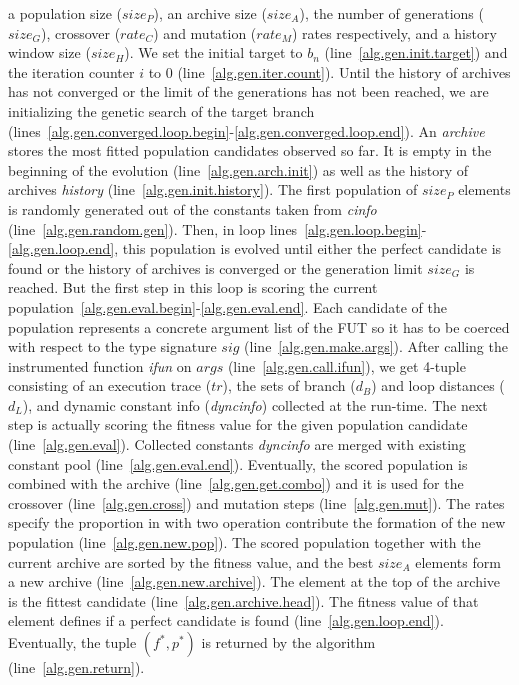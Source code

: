 \documentclass[sigconf]{acmart}
\begin{document}
a population size  ($size_P$), an archive size ($size_A$), the number of generations ($size_G$), crossover ($rate_C$) and mutation ($rate_M$) rates respectively, and a history window size ($size_H$). We set the initial target to $b_n$ (line~\ref{alg.gen.init.target}) and the iteration counter $i$ to 0 (line~\ref{alg.gen.iter.count}). Until the history of archives has not converged or the limit of the generations has not been reached, we are initializing the genetic search of the target branch (lines~\ref{alg.gen.converged.loop.begin}-\ref{alg.gen.converged.loop.end}). An \emph{archive} stores the most fitted population candidates observed so far. It is empty in the beginning of the evolution (line~\ref{alg.gen.arch.init}) as well as the history of archives \emph{history} (line~\ref{alg.gen.init.history}). The first population of $size_P$ elements is randomly generated out of the constants taken from \emph{cinfo} (line~\ref{alg.gen.random.gen}). Then, in loop lines~\ref{alg.gen.loop.begin}-\ref{alg.gen.loop.end}, this population is evolved until either the perfect candidate is found or the history of archives is converged or the generation limit $size_G$ is reached. But the first step in this loop is scoring the current population~\ref{alg.gen.eval.begin}-\ref{alg.gen.eval.end}. Each candidate of the population represents a concrete argument list of the FUT so it has to be coerced with respect to the type signature $sig$ (line~\ref{alg.gen.make.args}). After calling the instrumented function \emph{ifun} on $args$ (line~\ref{alg.gen.call.ifun}), we get 4-tuple consisting of an execution trace ($tr$), the sets of branch ($d_B$) and loop distances ($d_L$), and dynamic constant info (\emph{dyncinfo}) collected at the run-time. The next step is actually scoring the fitness value for the given population candidate (line~\ref{alg.gen.eval}). Collected constants \emph{dyncinfo} are merged with existing constant pool (line~\ref{alg.gen.eval.end}). Eventually, the scored population is combined with the archive (line~\ref{alg.gen.get.combo}) and it is used for the crossover (line~\ref{alg.gen.cross}) and mutation steps (line~\ref{alg.gen.mut}). The rates specify the proportion in with two operation contribute the formation of the new population (line~\ref{alg.gen.new.pop}). The scored population together with the current archive are sorted by the fitness value, and the best $size_A$ elements form a new archive (line~\ref{alg.gen.new.archive}). The element at the top of the archive is the fittest candidate (line~\ref{alg.gen.archive.head}). The fitness value of that element defines if a perfect candidate is found (line~\ref{alg.gen.loop.end}). Eventually, the tuple $(f^*, p^*)$ is returned by the algorithm (line~\ref{alg.gen.return}).
\end{document}
